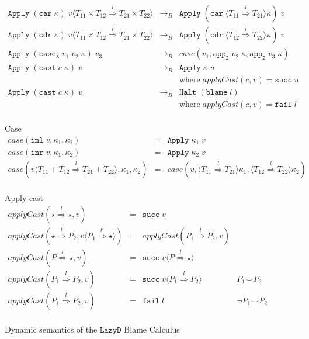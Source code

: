 \documentclass[acmsmall,review,anonymous]{acmart}\settopmatter{printfolios=true,printccs=false,printacmref=false}
\newcommand{\funrule}[3]{#1 &=& #2 & #3\\}
\newcommand{\redrule}[3]{#1 & \longrightarrow_B & #2 & #3\\}
\newcommand{\plus}[0]{+}
\newcommand{\lazyD}{$\mathtt{Lazy D}$}
\newcommand{\sOOinspect}[3]{\mathtt{Eval} \; #1 \; #2 \; #3}
\newcommand{\sOOreturn}[2]{\mathtt{Apply} \; #2 \; #1}
\newcommand{\sOOhalt}[1]{\mathtt{Halt} \; #1}
\newcommand{\POOprod}[2]{#1 \times #2}
\newcommand{\POOsum}[2]{#1 \plus #2}
\newcommand{\oOOblame}[1]{\mathtt{blame} \; #1}
\newcommand{\cOOcast}[3]{#1 \overset{#2}{\Rightarrow} #3}
\newcommand{\vOOcast}[2]{#1\langle#2\rangle}
\newcommand{\vOOfun}[3]{\mathtt{fun} \; #1 \; #2 \; #3}
\newcommand{\vOOinl}[1]{\mathtt{inl}\;#1}
\newcommand{\vOOinr}[1]{\mathtt{inr}\;#1}
\newcommand{\rOOsucc}[1]{\mathtt{succ}\;#1}
\newcommand{\rOOfail}[1]{\mathtt{fail}\;#1}
\begin{document}
\begin{figure}
\[\begin{array}{rclr}

	\redrule{
		\sOOreturn{
			\vOOcast{v}{\cOOcast{\POOprod{T_{11}}{T_{12}}}{l}{
					\POOprod{T_{21}}{T_{22}}}}
			}{(\mathtt{car} \; \kappa)}
	}{
		\sOOreturn{v}{(
			\mathtt{car} \;
			\langle \cOOcast{T_{11}}{l}{T_{21}} \rangle \kappa
			)}
	}{}

	\redrule{
		\sOOreturn{
			\vOOcast{v}{\cOOcast{\POOprod{T_{11}}{T_{12}}}{l}{
					\POOprod{T_{21}}{T_{22}}}}
		}{(\mathtt{cdr} \; \kappa)}
	}{
		\sOOreturn{v}{(
			\mathtt{cdr} \;
			\langle \cOOcast{T_{12}}{l}{T_{22}} \rangle \kappa
			)}
	}{}

	\redrule{
		\sOOreturn{v_3}{(
			\mathtt{case_3} \;
			v_1 \; v_2 \;
			\kappa
		)}
	}{case(v_1,
	\mathtt{app_2} \; v_2 \; \kappa,
	\mathtt{app_2} \; v_3 \; \kappa
	)}{}

	\redrule{
		\sOOreturn{v}{(
			\mathtt{cast} \; c \; \kappa
		)}
	}{
		\sOOreturn{u}{\kappa}
		\\ &
	}{
		\text{where} \; applyCast(c,v) = \rOOsucc{u}
	}

	\redrule{
		\sOOreturn{v}{(
			\mathtt{cast} \; c \; \kappa
			)}
	}{
		\sOOhalt{(\oOOblame{l})}
		\\ &
	}{
		\text{where} \; applyCast(c,v) = \rOOfail{l}
	}
	\end{array}
	\]	
	
	Case
	\[
	\begin{array}{rclr}
	\funrule{case(\vOOinl{v},\kappa_1,\kappa_2)}{
		\sOOreturn{v}{\kappa_1}
	}{}
	\funrule{case(\vOOinr{v},\kappa_1,\kappa_2)}{
		\sOOreturn{v}{\kappa_2}
	}{}
	\funrule{case(\vOOcast{v}{\cOOcast{\POOsum{T_{11}}{T_{12}}}{l}{\POOsum{T_{21}}{T_{22}}}},\kappa_1,\kappa_2)}{
		case(v,
		\langle \cOOcast{T_{11}}{l}{T_{21}} \rangle \kappa_1,
		\langle \cOOcast{T_{12}}{l}{T_{22}} \rangle \kappa_2)
	}{}
	\end{array}
	\]
	
	Apply cast
	\[
	\begin{array}{rclr}
	\funrule{
		applyCast(\cOOcast{\star}{l}{\star},v)
	}{
		\rOOsucc{v}
	}{}
	\funrule{
		applyCast(\cOOcast{\star}{l}{P_2},\vOOcast{v}{\cOOcast{P_1}{l'}{\star}})
	}{
		applyCast(\cOOcast{P_1}{l}{P_2},v)
	}{}
	\funrule{
		applyCast(\cOOcast{P}{l}{\star},v)
	}{
		\rOOsucc{\vOOcast{v}{\cOOcast{P}{l}{\star}}}
	}{}
	\funrule{
		applyCast(\cOOcast{P_1}{l}{P_2},v)
	}{
		\rOOsucc{\vOOcast{v}{\cOOcast{P_1}{l}{P_2}}}
	}{P_1 \smile P_2}
	\funrule{
		applyCast(\cOOcast{P_1}{l}{P_2},v)
	}{
		\rOOfail{l}
	}{\neg P_1 \smile P_2}
	
	\end{array}
	\]
	
	\caption{Dynamic semantics of the \lazyD{} Blame Calculus}
	\label{ld-blame-cek}
\end{figure}
\end{document}
